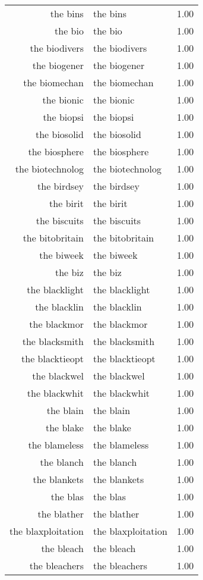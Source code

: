 \begin{table}[ht]
\begin{tabular}{rlr}
  the bins & the bins & 1.00 \\ 
  the bio & the bio & 1.00 \\ 
  the biodivers & the biodivers & 1.00 \\ 
  the biogener & the biogener & 1.00 \\ 
  the biomechan & the biomechan & 1.00 \\ 
  the bionic & the bionic & 1.00 \\ 
  the biopsi & the biopsi & 1.00 \\ 
  the biosolid & the biosolid & 1.00 \\ 
  the biosphere & the biosphere & 1.00 \\ 
  the biotechnolog & the biotechnolog & 1.00 \\ 
  the birdsey & the birdsey & 1.00 \\ 
  the birit & the birit & 1.00 \\ 
  the biscuits & the biscuits & 1.00 \\ 
  the bitobritain & the bitobritain & 1.00 \\ 
  the biweek & the biweek & 1.00 \\ 
  the biz & the biz & 1.00 \\ 
  the blacklight & the blacklight & 1.00 \\ 
  the blacklin & the blacklin & 1.00 \\ 
  the blackmor & the blackmor & 1.00 \\ 
  the blacksmith & the blacksmith & 1.00 \\ 
  the blacktieopt & the blacktieopt & 1.00 \\ 
  the blackwel & the blackwel & 1.00 \\ 
  the blackwhit & the blackwhit & 1.00 \\ 
  the blain & the blain & 1.00 \\ 
  the blake & the blake & 1.00 \\ 
  the blameless & the blameless & 1.00 \\ 
  the blanch & the blanch & 1.00 \\ 
  the blankets & the blankets & 1.00 \\ 
  the blas & the blas & 1.00 \\ 
  the blather & the blather & 1.00 \\ 
  the blaxploitation & the blaxploitation & 1.00 \\ 
  the bleach & the bleach & 1.00 \\ 
  the bleachers & the bleachers & 1.00 \\ 

\end{tabular}
\end{table}
